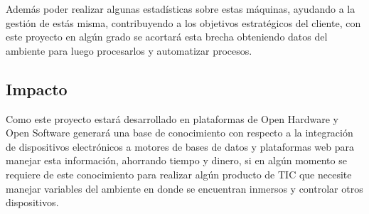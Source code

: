 Además poder realizar algunas estadísticas sobre estas máquinas, ayudando a la gestión de estás misma, contribuyendo a los objetivos estratégicos del cliente, con este proyecto en algún grado se acortará esta brecha obteniendo datos del ambiente para luego procesarlos y
automatizar procesos.
\newpage
\subsection{Impacto}

Como este proyecto estará desarrollado en plataformas de Open Hardware y Open Software generará una base de conocimiento con respecto a la integración de dispositivos electrónicos a motores de bases de datos y plataformas web para manejar esta información, ahorrando tiempo y dinero, si en algún momento se requiere de este conocimiento para realizar algún producto de TIC que necesite manejar variables del ambiente en donde se encuentran inmersos y controlar otros dispositivos.

